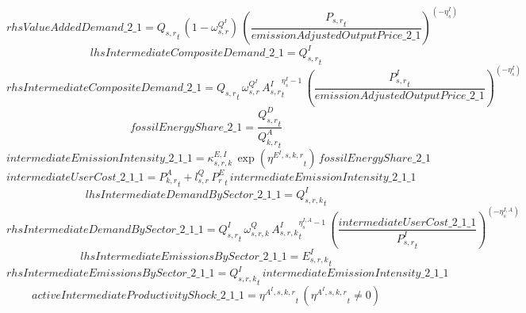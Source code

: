 \begin{dmath*}
rhsValueAddedDemand\_2\_1 = {{Q_{s,r}}}_{t}\, \left(1-{{\omega^{Q^{I}}_{s,r}}}\right)\, \left(\frac{{{P_{s,r}}}_{t}}{{emissionAdjustedOutputPrice\_2\_1}}\right)^{\left(-{{\eta^{I}_{s}}}\right)}
\end{dmath*}
\begin{dmath*}
lhsIntermediateCompositeDemand\_2\_1 = {{Q^{I}_{s,r}}}_{t}
\end{dmath*}
\begin{dmath*}
rhsIntermediateCompositeDemand\_2\_1 = {{Q_{s,r}}}_{t}\, {{\omega^{Q^{I}}_{s,r}}}\, {{A^{I}_{s,r}}}_{t}^{{{\eta^{I}_{s}}}-1}\, \left(\frac{{{P^{I}_{s,r}}}_{t}}{{emissionAdjustedOutputPrice\_2\_1}}\right)^{\left(-{{\eta^{I}_{s}}}\right)}
\end{dmath*}
\begin{dmath*}
fossilEnergyShare\_2\_1 = \frac{{{Q^{D}_{s,r}}}_{t}}{{{Q^{A}_{k,r}}}_{t}}
\end{dmath*}
\begin{dmath*}
intermediateEmissionIntensity\_2\_1\_1 = {{\kappa^{E,I}_{s,r,k}}}\, \exp\left({{\eta^{E^{I},s,k,r}}}_{t}\right)\, {fossilEnergyShare\_2\_1}
\end{dmath*}
\begin{dmath*}
intermediateUserCost\_2\_1\_1 = {{P^{A}_{k,r}}}_{t}+{{l^{Q}_{s,r}}}\, {{P^E_r}}_{t}\, {intermediateEmissionIntensity\_2\_1\_1}
\end{dmath*}
\begin{dmath*}
lhsIntermediateDemandBySector\_2\_1\_1 = {{Q^{I}_{s,r,k}}}_{t}
\end{dmath*}
\begin{dmath*}
rhsIntermediateDemandBySector\_2\_1\_1 = {{Q^{I}_{s,r}}}_{t}\, {{\omega^{Q}_{s,r,k}}}\, {{A^{I}_{s,r,k}}}_{t}^{{{\eta^{I,A}_{s}}}-1}\, \left(\frac{{intermediateUserCost\_2\_1\_1}}{{{P^{I}_{s,r}}}_{t}}\right)^{\left(-{{\eta^{I,A}_{s}}}\right)}
\end{dmath*}
\begin{dmath*}
lhsIntermediateEmissionsBySector\_2\_1\_1 = {{E^I_{s,r,k}}}_{t}
\end{dmath*}
\begin{dmath*}
rhsIntermediateEmissionsBySector\_2\_1\_1 = {{Q^{I}_{s,r,k}}}_{t}\, {intermediateEmissionIntensity\_2\_1\_1}
\end{dmath*}
\begin{dmath*}
activeIntermediateProductivityShock\_2\_1\_1 = {{\eta^{A^{I},s,k,r}}}_{t}\, \left({{\eta^{A^{I},s,k,r}}}_{t}\neq 0\right)
\end{dmath*}
